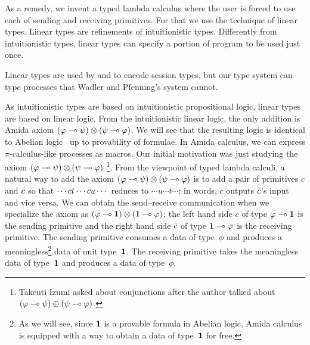 As a remedy, we invent a typed lambda calculus where
the user is forced to use each of sending and receiving primitives.
For that we use the technique of linear types.
Linear types are refinements of intuitionistic types.
Differently from intuitionistic types,
linear types can specify a portion of program to be used
just once.

Linear types are used by \citet{wadler2012propositions} and
\citet{pfenning2010} to encode session types, but our type system can
type processes that Wadler and Pfenning's system cannot.

As intuitionistic types are based on intuitionistic propositional logic,
linear types are based on linear logic.
From the intuitionistic linear logic,
the only addition is Amida axiom
$(\varphi\multimap\psi)\otimes(\psi\multimap\varphi)$.
We will see that the resulting logic is identical to Abelian
logic~\citep{casari1989} up to provability of formulae.
In Amida calculus, we can express $\pi$-calculus-like processes as macros.
Our initial motivation was just studying the axiom
$(\varphi\multimap\psi)\otimes(\psi\multimap\varphi)$%
\footnote{Takeuti Izumi asked about conjunctions
after the author talked about $(\varphi\multimap\psi)\oplus (\psi\multimap\varphi)$.}.
From the viewpoint of typed lambda calculi, a natural way to add
the axiom
$(\varphi\multimap\psi)\otimes(\psi\multimap\varphi)$
is to add a pair of primitives $c$ and $\bar{c}$ so that
$\cdots ct \cdots \bar{c} u \cdots$ reduces to
$\cdots u  \cdots t \cdots$: in words,
$c$ outputs $\bar{c}$'s input and vice versa.
We can obtain the send--receive communication when we specialize the
axiom as $(\varphi\multimap \mathbf{1})\otimes(\mathbf{1}\multimap\varphi)$; the left hand side
${c}$ of type ${\varphi\multimap\mathbf{1}}$ is the sending primitive and
the right hand side ${\bar{c}}$ of type ${\mathbf{1} \multimap\varphi}$ is the receiving
primitive.
The sending primitive consumes a data of type~$\phi$ and produces a
meaningless\footnote{As we will see, since $\mathbf{1}$ is a provable formula
in Abelian logic, Amida calculus is equipped with a way to obtain a data
of type~$\mathbf{1}$ for free.} data of unit type~$\mathbf{1}$.
The receiving primitive takes the meaningless data of type~$\mathbf{1}$ and
produces a data of type~$\phi$.


